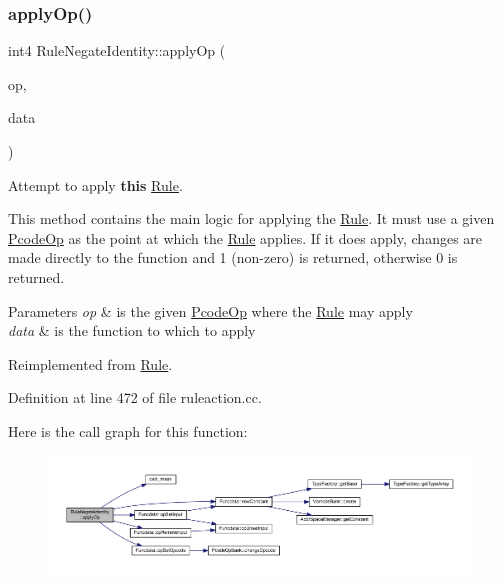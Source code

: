 \subsubsection{\texorpdfstring{applyOp()}{applyOp()}}
{\footnotesize\ttfamily int4 Rule\+Negate\+Identity\+::apply\+Op (\begin{DoxyParamCaption}\item[{\mbox{\hyperlink{class_pcode_op}{Pcode\+Op}} $\ast$}]{op,  }\item[{\mbox{\hyperlink{class_funcdata}{Funcdata}} \&}]{data }\end{DoxyParamCaption})\hspace{0.3cm}{\ttfamily [virtual]}}



Attempt to apply {\bfseries{this}} \mbox{\hyperlink{class_rule}{Rule}}. 

This method contains the main logic for applying the \mbox{\hyperlink{class_rule}{Rule}}. It must use a given \mbox{\hyperlink{class_pcode_op}{Pcode\+Op}} as the point at which the \mbox{\hyperlink{class_rule}{Rule}} applies. If it does apply, changes are made directly to the function and 1 (non-\/zero) is returned, otherwise 0 is returned. 
\begin{DoxyParams}{Parameters}
{\em op} & is the given \mbox{\hyperlink{class_pcode_op}{Pcode\+Op}} where the \mbox{\hyperlink{class_rule}{Rule}} may apply \\
\hline
{\em data} & is the function to which to apply \\
\hline
\end{DoxyParams}


Reimplemented from \mbox{\hyperlink{class_rule_a4e3e61f066670175009f60fb9dc60848}{Rule}}.



Definition at line 472 of file ruleaction.\+cc.

Here is the call graph for this function\+:
\nopagebreak
\begin{figure}[H]
\begin{center}
\leavevmode
\includegraphics[width=350pt]{class_rule_negate_identity_a9de23484c0f96f82044def3765270523_cgraph}
\end{center}
\end{figure}
\mbox{\label{class_rule_negate_identity_a359bedbb109cb97b3d27577486a51a7b}} 
